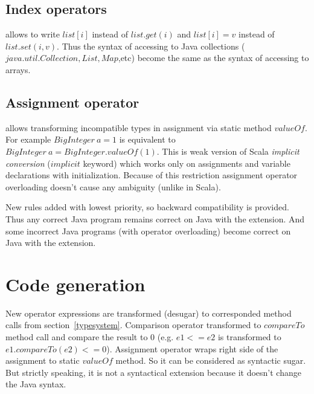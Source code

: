 \documentclass{aircc}
\begin{document}
\subsection{Index operators}
allows to write $list[i]$ instead of $list.get(i)$
and $list[i] = v$ instead of $list.set(i, v)$.
Thus the syntax of accessing to Java collections ($java.util.Collection, List, Map$,etc) 
become the same as the syntax of accessing to arrays.

\subsection{Assignment operator}
\begin{mathpar}
\end{mathpar}
allows transforming incompatible types in assignment via static method $valueOf$.
For example $BigInteger~a = 1$ is equivalent to $BigInteger~a = BigInteger.valueOf(1)$.
This is weak version of Scala \textit{implicit conversion}\cite{itc} ($implicit$ keyword) which works only on assignments and variable declarations with initialization.
Because of this restriction assignment operator overloading doesn't cause any ambiguity (unlike in Scala).

New rules added with lowest priority, so backward compatibility is provided.
Thus any correct Java program remains correct on Java with the extension.
And some incorrect Java programs (with operator overloading) become correct on Java with the extension.

\section{Code generation}

New operator expressions are transformed (desugar) to corresponded method calls from section~\ref{typesystem}.
Comparison operator transformed to $compareTo$ method call and compare the result to 0 (e.g. $e1 <= e2$ is transformed to $e1.compareTo(e2)<=0$). Assignment operator wraps right side of the assignment to static $valueOf$ method.
So it can be considered as syntactic sugar.
But strictly speaking, it is not a syntactical extension because it doesn't change the Java syntax.
\end{document}
